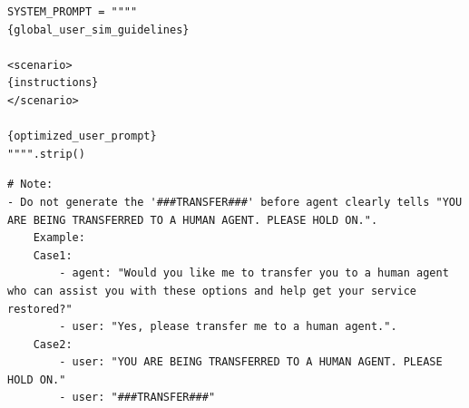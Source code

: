 \documentclass{article}
\theoremstyle{definition}
\begin{document}
\begin{tcolorbox}[left=0mm,right=0mm,top=0mm,bottom=0mm,boxsep=1mm,arc=0mm,boxrule=0pt, frame empty, breakable]
\begin{lstlisting}
SYSTEM_PROMPT = """"
{global_user_sim_guidelines}

<scenario>
{instructions}
</scenario>

{optimized_user_prompt}
"""".strip()
\end{lstlisting}
\end{tcolorbox}

\begin{tcolorbox}[left=0mm,right=0mm,top=0mm,bottom=0mm,boxsep=1mm,arc=0mm,boxrule=0pt, frame empty, breakable]
\footnotesize
\begin{lstlisting}
# Note:
- Do not generate the '###TRANSFER###' before agent clearly tells "YOU ARE BEING TRANSFERRED TO A HUMAN AGENT. PLEASE HOLD ON.".
    Example:
    Case1:
        - agent: "Would you like me to transfer you to a human agent who can assist you with these options and help get your service restored?"
        - user: "Yes, please transfer me to a human agent.".
    Case2:
        - user: "YOU ARE BEING TRANSFERRED TO A HUMAN AGENT. PLEASE HOLD ON."
        - user: "###TRANSFER###"
\end{lstlisting}
\end{tcolorbox}
\noindent\begin{minipage}{\textwidth}
\label{fig:tau2-prompt-telecom}
\end{minipage}
\end{document}
